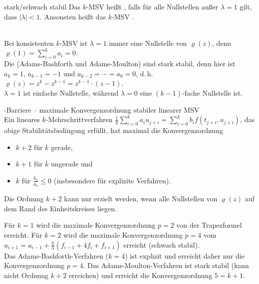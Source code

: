 \begin{Def}{stark/schwach stabil}
    Das $k$-MSV heißt , falls
    für alle Nullstellen außer $\lambda = 1$ gilt, dass $|\lambda| < 1$.
    Ansonsten heißt das $k$-MSV .
\end{Def}

\begin{Bem}\\
    Bei konsistenten $k$-MSV ist $\lambda = 1$ immer eine Nullstelle von
    $\varrho(z)$, denn
    $\varrho(1) = \sum_{i=0}^k a_i = 0$.\\
    Die 
    (Adams-Bashforth und Adams-Moulton) sind stark stabil,
    denn hier ist $a_k = 1$, $a_{k-1} = -1$ und
    $a_{k-2} = \dotsb = a_0 = 0$, d.\,h.
    $\varrho(z) = z^k - z^{k-1} = z^{k-1} \cdot (z - 1)$.\\
    $\lambda = 1$ ist einfache Nullstelle, während
    $\lambda = 0$ eine $(k - 1)$-fache Nullstelle ist.
\end{Bem}

\linie

\begin{Satz}{-Barriere -- maximale Konvergenzordnung
             stabiler linearer MSV}\\
    Ein lineares $k$-Mehrschrittverfahren
    $\frac{1}{h} \sum_{i=0}^k a_i u_{j+i} =
    \sum_{i=0}^k b_i f(t_{j+i}, u_{j+i})$, das obige
    Stabilitätsbedingung erfüllt, hat maximal die Konvergenzordnung
    \begin{itemize}
        \item
        $k + 2$ für $k$ gerade,

        \item
        $k + 1$ für $k$ ungerade und

        \item
        $k$ für $\frac{b_k}{a_k} \le 0$ (insbesondere für explizite Verfahren).
    \end{itemize}
    Die Ordnung $k + 2$ kann nur erzielt werden, wenn alle Nullstellen von
    $\varrho(z)$ auf dem Rand des Einheitskreises liegen.
\end{Satz}

\begin{Bsp}
    Für $k = 1$ wird die maximale Konvergenzordnung $p = 2$ von
    der Trapezformel erreicht.
    Für $k = 2$ wird die maximale Konvergenzordnung $p = 4$ vom
    $u_{i+1} = u_{i-1} + \frac{h}{3} (f_{i-1} + 4 f_i + f_{i+1})$
    erreicht (schwach stabil).\\
    Das Adams-Bashforth-Verfahren ($k = 4$) ist explizit und erreicht daher
    nur die Konvergenzordnung $p = 4$.
    Das Adams-Moulton-Verfahren ist stark stabil (kann nicht Ordnung $k + 2$
    erreichen) und erreicht die Konvergenzordnung $5 = k + 1$.
\end{Bsp}

